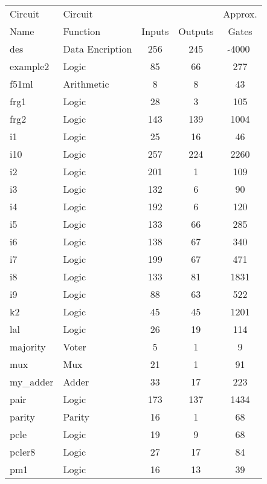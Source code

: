 {\begin{pespace}
\begin{center}
\begin{tabular}{|l|l|c|c|c|}
Circuit & Circuit          &        &         & Approx.\\
Name    & Function         & Inputs & Outputs & Gates \\ \hline
des     & Data Encription  & 256    & 245     &  $\tilde{}$4000  \\
example2& Logic            & 85     & 66      &   277 \\
f51ml	& Arithmetic       & 8      & 8       &    43 \\
frg1    & Logic            & 28     & 3       &   105 \\
frg2    & Logic            & 143    & 139     &  1004 \\
i1      & Logic            & 25     & 16      &    46 \\
i10     & Logic            & 257    & 224     &  2260 \\
i2      & Logic            & 201    & 1       &   109 \\
i3      & Logic            & 132    & 6       &    90 \\
i4      & Logic            & 192    & 6       &   120 \\
i5      & Logic            & 133    & 66      &   285 \\
i6      & Logic            & 138    & 67      &   340 \\
i7      & Logic            & 199    & 67      &   471 \\
i8      & Logic            & 133    & 81      &  1831 \\
i9      & Logic            &  88    & 63      &   522 \\
k2      & Logic            &  45    & 45      &  1201 \\
lal     & Logic            &  26    & 19      &   114 \\
majority& Voter            &   5    & 1       &     9 \\
mux     & Mux              &  21    & 1       &    91 \\
my\_adder& Adder           &  33    & 17      &   223 \\
pair    & Logic            & 173    & 137     &  1434 \\
parity  & Parity           &  16    & 1       &    68 \\
pcle    & Logic            &  19    & 9       &    68 \\
pcler8  & Logic            &  27    & 17      &    84 \\
pm1     & Logic            &  16    & 13      &    39 \\

\end{tabular}
\end{center}
\end{pespace}}
